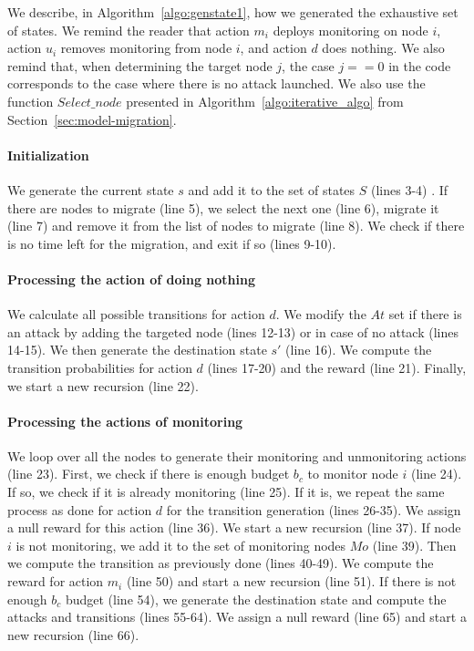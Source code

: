 We describe, in Algorithm~\ref{algo:genstate1}, how we generated the exhaustive set of states.
We remind the reader that action $m_i$ deploys monitoring on node $i$, action $u_i$ removes monitoring from node $i$, and action $d$ does nothing.
We also remind that, when determining the target node $j$, the case $j==0$ in the code corresponds to the case where there is no attack launched.
We also use the function $Select\_node$ presented in Algorithm~\ref{algo:iterative_algo} from Section~\ref{sec:model-migration}.

\paragraph{Initialization}
We generate the current state $s$ and add it to the set of states $S$ (lines 3-4) .
If there are nodes to migrate (line 5), we select the next one (line 6), migrate it (line 7) and remove it from the list of nodes to migrate (line 8).
We check if there is no time left for the migration, and exit if so (lines 9-10).

\paragraph{Processing the action of doing nothing}
We calculate all possible transitions for action $d$.
We modify the $At$ set if there is an attack by adding the targeted node (lines 12-13) or in case of no attack (lines 14-15).
We then generate the destination state $s'$ (line 16).
We compute the transition probabilities for action $d$ (lines 17-20) and the reward (line 21).
Finally, we start a new recursion (line 22).

\paragraph{Processing the actions of monitoring}
We loop over all the nodes to generate their monitoring and unmonitoring actions (line 23).
First, we check if there is enough budget $b_c$ to monitor node $i$ (line 24).
If so, we check if it is already monitoring (line 25).
If it is, we repeat the same process as done for action $d$ for the transition generation (lines 26-35).
We assign a null reward for this action (line 36).
We start a new recursion (line 37).
If node $i$ is not monitoring, we add it to the set of monitoring nodes $Mo$ (line 39).
Then we compute the transition as previously done (lines 40-49).
We compute the reward for action $m_i$ (line 50) and start a new recursion (line 51).
If there is not enough $b_c$ budget (line 54), we generate the destination state and compute the attacks and  transitions (lines 55-64).
We assign a null reward (line 65) and start a new recursion (line 66).

